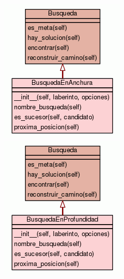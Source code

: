 \documentclass[letter, titlepage, 10pt]{article}
\begin{document}
    \begin{figure}[H]
  \centering
    \begin{minipage}{.5\textwidth}
        \centering
        \includegraphics[width=0.5\linewidth]{images/diagram_bea}
    \end{minipage}%
    \begin{minipage}{.5\textwidth}
        \centering
        \includegraphics[width=0.5\linewidth]{images/diagram_bep}
    \end{minipage}
\end{figure}
\end{document}
